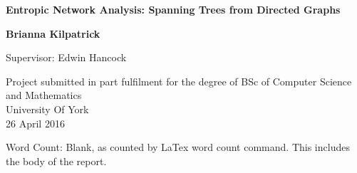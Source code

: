 \begin{titlepage}
    \begin{center}
        \vspace*{1cm}
        
        \Huge
         \textbf{Entropic Network Analysis: Spanning Trees from Directed Graphs}
        
        
        \vspace{1.5cm}
        \Large
        \textbf{Brianna Kilpatrick}
        
       
        \vspace{0.8cm}
        \normalsize
        Supervisor: Edwin Hancock
        
        \vspace{1.5cm}
        
                
        Project submitted in part fulfilment for the degree of  BSc of  Computer Science and Mathematics \\

        \vspace{0.1cm}
   	University Of York\\
	\vspace{0.1cm}
 	26 April 2016
	
	\vspace{5cm}
	
	Word Count: Blank, as counted by LaTex word count command. This includes the body of the report.
        
    \end{center}
\end{titlepage}